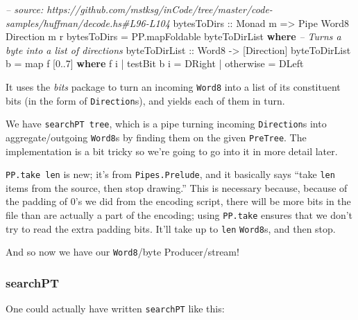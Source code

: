 \documentclass[]{article}
\newenvironment{Shaded}{}{}
\newcommand{\KeywordTok}[1]{\textcolor[rgb]{0.00,0.44,0.13}{\textbf{#1}}}
\newcommand{\DataTypeTok}[1]{\textcolor[rgb]{0.56,0.13,0.00}{#1}}
\newcommand{\DecValTok}[1]{\textcolor[rgb]{0.25,0.63,0.44}{#1}}
\newcommand{\CommentTok}[1]{\textcolor[rgb]{0.38,0.63,0.69}{\textit{#1}}}
\newcommand{\OtherTok}[1]{\textcolor[rgb]{0.00,0.44,0.13}{#1}}
\newcommand{\FunctionTok}[1]{\textcolor[rgb]{0.02,0.16,0.49}{#1}}
\newcommand{\NormalTok}[1]{#1}
\begin{document}
\begin{Shaded}
\begin{Highlighting}[]
\CommentTok{-- source: https://github.com/mstksg/inCode/tree/master/code-samples/huffman/decode.hs#L96-L104}
\OtherTok{bytesToDirs ::} \DataTypeTok{Monad}\NormalTok{ m }\OtherTok{=>} \DataTypeTok{Pipe} \DataTypeTok{Word8} \DataTypeTok{Direction}\NormalTok{ m r}
\NormalTok{bytesToDirs }\FunctionTok{=}\NormalTok{ PP.mapFoldable byteToDirList}
  \KeywordTok{where}
    \CommentTok{-- Turns a byte into a list of directions}
\OtherTok{    byteToDirList ::} \DataTypeTok{Word8} \OtherTok{->}\NormalTok{ [}\DataTypeTok{Direction}\NormalTok{]}
\NormalTok{    byteToDirList b }\FunctionTok{=}\NormalTok{ map f [}\DecValTok{0}\FunctionTok{..}\DecValTok{7}\NormalTok{]}
      \KeywordTok{where}
\NormalTok{        f i }\FunctionTok{|}\NormalTok{ testBit b i }\FunctionTok{=} \DataTypeTok{DRight}
            \FunctionTok{|}\NormalTok{ otherwise   }\FunctionTok{=} \DataTypeTok{DLeft}
\end{Highlighting}
\end{Shaded}

It uses the \emph{bits} package to turn an incoming \texttt{Word8} into a list
of its constituent bits (in the form of \texttt{Direction}s), and yields each of
them in turn.

We have \texttt{searchPT\ tree}, which is a pipe turning incoming
\texttt{Direction}s into aggregate/outgoing \texttt{Word8}s by finding them on
the given \texttt{PreTree}. The implementation is a bit tricky so we're going to
go into it in more detail later.

\texttt{PP.take\ len} is new; it's from \texttt{Pipes.Prelude}, and it basically
says ``take \texttt{len} items from the source, then stop drawing.'' This is
necessary because, because of the padding of 0's we did from the encoding
script, there will be more bits in the file than are actually a part of the
encoding; using \texttt{PP.take} ensures that we don't try to read the extra
padding bits. It'll take up to \texttt{len} \texttt{Word8}s, and then stop.

And so now we have our \texttt{Word8}/byte Producer/stream!

\subsubsection{searchPT}\label{searchpt}

One could actually have written \texttt{searchPT} like this:
\end{document}
